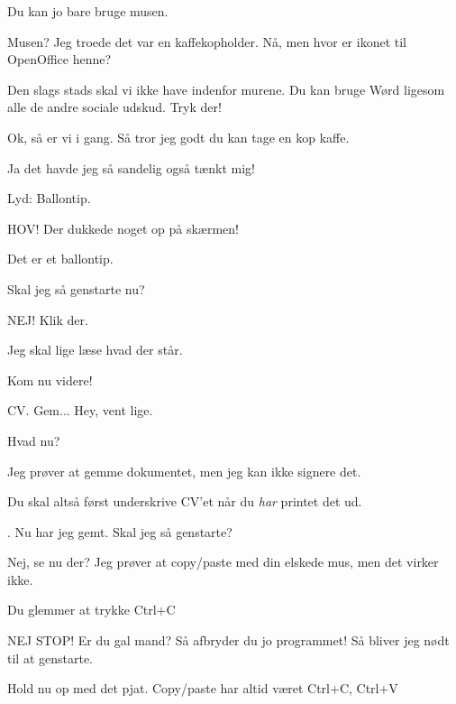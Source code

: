 \documentclass[a4paper,11pt]{article}
\begin{document}
\begin{sketch}
 Du kan jo bare bruge musen.

 Musen?  Jeg troede det var en kaffekopholder. Nå, men hvor er ikonet til OpenOffice henne?

 Den slags stads skal vi ikke have indenfor murene. Du kan bruge Wørd ligesom alle de andre sociale udskud. Tryk der!


 Ok, så er vi i gang. Så tror jeg godt du kan tage en kop kaffe.

 Ja det havde jeg så sandelig også tænkt mig!


\scene Lyd: Ballontip.

 HOV! Der dukkede noget op på skærmen!


 Det er et ballontip.

 Skal jeg så genstarte nu?

 NEJ! Klik der.

 Jeg skal lige læse hvad der står.

 Kom nu videre! 


 CV. Gem... Hey, vent lige.

 Hvad nu?

 Jeg prøver at gemme dokumentet, men jeg kan ikke signere det.

 Du skal altså først underskrive CV'et når du \emph{har} printet det ud.

 . Nu har jeg gemt. Skal jeg så genstarte?


 Nej, se nu der? Jeg prøver at copy/paste med din elskede mus, men det virker ikke.

 Du glemmer at trykke Ctrl+C 

 NEJ STOP!  Er du gal mand? Så afbryder du jo programmet! Så bliver jeg nødt til at genstarte.

 Hold nu op med det pjat. Copy/paste har altid været Ctrl+C, Ctrl+V 


\end{sketch}
\end{document}
